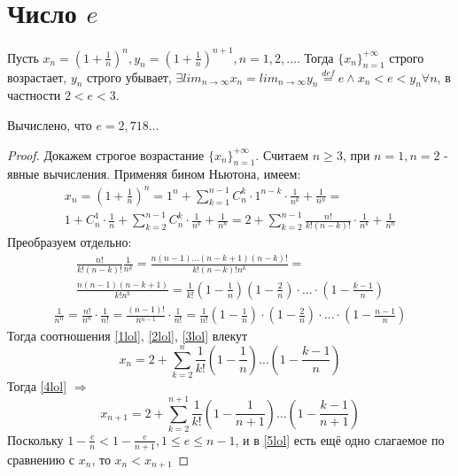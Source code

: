 \documentclass[main]{subfiles}
\begin{document}
\section{Число $e$}
\begin{theorem}
    Пусть $x_n = \left(1 + \frac{1}{n}\right)^n, y_n = 
    \left(1 + \frac{1}{n}\right)^{n+1}, n = 1,2, \ldots$. Тогда 
    $\{x_n\}_{n=1}^{+\infty}$ строго возрастает, $y_n$ строго убывает,
    $\exists lim_{n\to\infty}x_n = lim_{n\to\infty}y_n \overset{def}{=} e 
    \wedge x_n < e < y_n \forall n$, в частности $2 < e < 3$.
\end{theorem}
\begin{remark}
    Вычислено, что $e = 2,718\dots$
\end{remark}
\begin{proof}
    Докажем строгое возрастание $\{x_n\}_{n=1}^{+\infty}$. Считаем $n\geq 3$,
    при $n = 1, n = 2$ - явные вычисления. Применяя бином Ньютона, имеем:
    \begin{multline}\label{1lol}
        x_n = \left(1 + \frac{1}{n}\right)^n = 1^n + 
        \sum_{k=1}^{n-1}C_n^k\cdot 1^{n-k}\cdot\frac{1}{n^k} + \frac{1}{n^n} =\\
        1 + C_n^1\cdot\frac{1}{n} + \sum_{k=2}^{n-1}C_n^k\cdot\frac{1}{n^k} + 
        \frac{1}{n^n} = 2 + \sum_{k=2}^{n-1}\frac{n!}{k!(n-k)!}\cdot\frac{1}{n^k} +
        \frac{1}{n^n}
    \end{multline}
    Преобразуем отдельно:
    \begin{multline}\label{2lol}
        \frac{n!}{k!(n-k)!}\frac{1}{n^k} = 
        \frac{n(n-1)\ldots(n-k+1)(n-k)!}{k!(n-k)!n^k} = \\
        \frac{n(n-1)(n-k+1)}{k!n^k} = 
        \frac{1}{k!}\left(1 - \frac{1}{n}\right)\left(1 - \frac{2}{n}\right)
        \cdot\ldots\cdot\left(1 - \frac{k-1}{n}\right)
    \end{multline}
    \begin{multline}\label{3lol}
        \frac{1}{n^n} = \frac{n!}{n^n}\cdot\frac{1}{n!} = 
        \frac{(n-1)!}{n^{n-1}}\cdot\frac{1}{n!} = 
        \frac{1}{n!}\left(1-\frac{1}{n}\right)\cdot\left(1-\frac{2}{n}\right)
        \cdot\ldots\cdot\left(1-\frac{n-1}{n}\right)
    \end{multline}
    Тогда соотношения \ref{1lol}, \ref{2lol}, \ref{3lol} влекут 
    \begin{equation}\label{4lol}
        x_n = 2 + \sum_{k=2}^n\frac{1}{k!}\left(1 - \frac{1}{n}\right)\ldots
        \left(1 - \frac{k-1}{n}\right)
    \end{equation}
    Тогда \ref{4lol} $\Rightarrow$
    \begin{equation}\label{5lol}
        x_{n+1} = 2 + \sum_{k=2}^{n+1}\frac{1}{k!}\left(1 - \frac{1}{n+1}\right)\ldots
        \left(1 - \frac{k-1}{n+1}\right)
    \end{equation}
    Поскольку $1 - \frac{e}{n} < 1 - \frac{e}{n + 1}, 1 \leq e \leq n - 1$, и в
    \ref{5lol} есть ещё одно слагаемое по сравнению с $x_n$, то 
    $x_n < x_{n+1}$


\end{proof}
\end{document}
